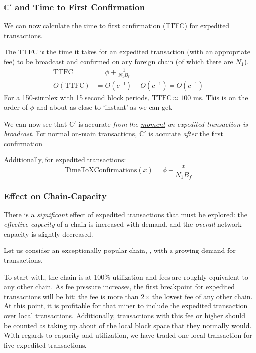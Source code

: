 \subsubsection{\texorpdfstring{$\mathbb{C}'$}{C′} and Time to First Confirmation}

We can now calculate the time to first confirmation (TTFC) for expedited transactions.

The TTFC is the time it takes for an expedited transaction (with an appropriate fee) to be broadcast and confirmed on any foreign chain (of which there are $N_1$).
\begin{align*}
    \text{TTFC} &= \phi + \frac{1}{N_1 B_f} \\
    O(\text{TTFC}) &= O(c^{-1}) + O(c^{-1}) = O(c^{-1})
\end{align*}
For a 150-simplex with 15 second block periods, $\text{TTFC} \approx 100 \text{ ms}$.
This is on the order of $\phi$ and about as close to `instant' as we can get.

We can now see that $\mathbb{C}'$ is accurate \emph{from the \ul{moment} an expedited transaction is broadcast}.
For normal on-main transactions, $\mathbb{C}'$ is accurate \emph{after} the first confirmation.

Additionally, for expedited transactions:
$$
\text{TimeToXConfirmations}(x) = \phi + \frac{x}{N_1 B_f}
$$


\subsubsection{Effect on Chain-Capacity}

There is a \emph{significant} effect of expedited transactions that must be explored: the \emph{effective capacity} of a chain is increased with demand, and the \emph{overall} network capacity is slightly decreased.

Let us consider an exceptionally popular chain, \cL, with a growing demand for transactions.

To start with, the chain is at 100\% utilization and fees are roughly equivalent to any other chain.
As fee pressure increases, the first breakpoint for expedited transactions will be hit: the fee is more than 2$\times$ the lowest fee of any other chain.
At this point, it is profitable for that \cR miner to include the expedited transaction over local transactions.
Additionally, transactions with this fee or higher should be counted as taking up about  of the local block space that they normally would.
With regards to capacity and utilization, we have traded one local transaction for five expedited transactions.

